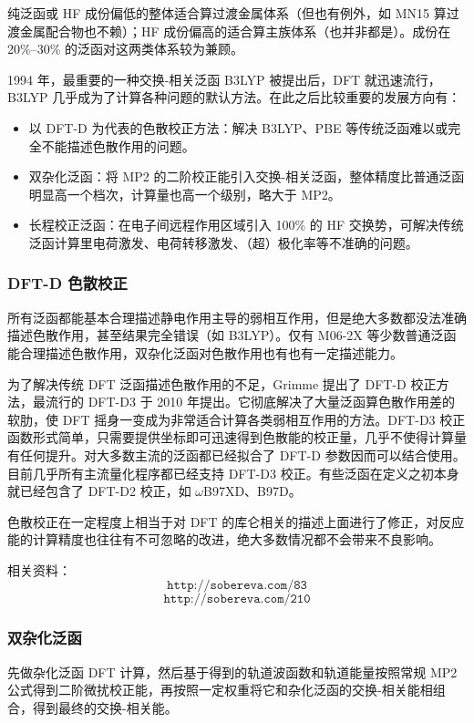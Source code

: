 纯泛函或 HF 成份偏低的整体适合算过渡金属体系（但也有例外，如 MN15 算过渡金属配合物也不赖）；HF 成份偏高的适合算主族体系（也并非都是）。成份在 20\%--30\% 的泛函对这两类体系较为兼顾。

1994 年，最重要的一种交换-相关泛函 B3LYP 被提出后，DFT 就迅速流行，B3LYP 几乎成为了计算各种问题的默认方法。在此之后比较重要的发展方向有：
\begin{itemize}
  \item 以 DFT-D 为代表的色散校正方法：解决 B3LYP、PBE 等传统泛函难以或完全不能描述色散作用的问题。
  \item 双杂化泛函：将 MP2 的二阶校正能引入交换-相关泛函，整体精度比普通泛函明显高一个档次，计算量也高一个级别，略大于 MP2。
  \item 长程校正泛函：在电子间远程作用区域引入 100\% 的 HF 交换势，可解决传统泛函计算里电荷激发、电荷转移激发、（超）极化率等不准确的问题。
\end{itemize}

\subsubsection*{DFT-D 色散校正}

所有泛函都能基本合理描述静电作用主导的弱相互作用，但是绝大多数都没法准确描述色散作用，甚至结果完全错误（如 B3LYP）。仅有 M06-2X 等少数普通泛函能合理描述色散作用，双杂化泛函对色散作用也有也有一定描述能力。

为了解决传统 DFT 泛函描述色散作用的不足，Grimme 提出了 DFT-D 校正方法，最流行的 DFT-D3 于 2010 年提出。它彻底解决了大量泛函算色散作用差的软肋，使 DFT 摇身一变成为非常适合计算各类弱相互作用的方法。DFT-D3 校正函数形式简单，只需要提供坐标即可迅速得到色散能的校正量，几乎不使得计算量有任何提升。对大多数主流的泛函都已经拟合了 DFT-D 参数因而可以结合使用。目前几乎所有主流量化程序都已经支持 DFT-D3 校正。有些泛函在定义之初本身就已经包含了 DFT-D2 校正，如 $\omega$B97XD、B97D。

色散校正在一定程度上相当于对 DFT 的库仑相关的描述上面进行了修正，对反应能的计算精度也往往有不可忽略的改进，绝大多数情况都不会带来不良影响。

相关资料：
\[
\texttt{http://sobereva.com/83}
\]
\[
\texttt{http://sobereva.com/210}
\]

\subsubsection*{双杂化泛函}

先做杂化泛函 DFT 计算，然后基于得到的轨道波函数和轨道能量按照常规 MP2 公式得到二阶微扰校正能，再按照一定权重将它和杂化泛函的交换-相关能相组合，得到最终的交换-相关能。

